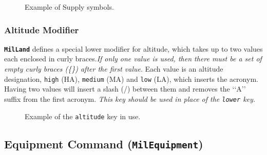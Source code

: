 \documentclass[a4paper, titlepage]{article}
\begin{document}
\begin{figure}[H]
\centering
{}
\caption{Example of Supply symbols.}
\end{figure}


\subsubsection{Altitude Modifier}

\textbf{\texttt{MilLand}} defines a special lower modifier for altitude, which takes up to two values each enclosed in curly braces.\textit{If only one value is used, then there must be a set of empty curly braces (\{\}) after the first value}. Each value is an altitude designation, \texttt{high} (HA), \texttt{medium} (MA) and \texttt{low} (LA), which inserts the acronym. Having two values will insert a slash (/) between them and removes the \lq\lq{}A\rq\rq{} suffix from the first acronym. \textit{This key should be used in place of the \texttt{lower} key.}

\begin{figure}[H]
\centering
{}
\caption{Example of the \texttt{altitude} key in use.}
\end{figure}

\newpage\subsection{Equipment Command (\textbf{\texttt{MilEquipment}})}
\end{document}
